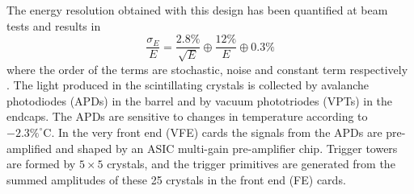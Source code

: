 The energy resolution obtained with this design has been quantified at beam tests and results in 
\begin{equation}
\frac{\sigma_{E}}{E}=\frac{2.8\%}{\sqrt{E}}\oplus\frac{12\%}{E}\oplus0.3\%
\end{equation}
where the order of the terms are stochastic, noise and constant term respectively \cite{Chatrchyan:2013dga}. 
The light produced in the scintillating crystals is collected by avalanche photodiodes (APDs) in the barrel and by vacuum phototriodes (VPTs) in the endcaps. 
The APDs are sensitive to changes in temperature according to $-2.3\%^{\circ}\mathrm{C}$. 
In the very front end (VFE) cards the signals from the APDs are pre-amplified and shaped by an ASIC multi-gain pre-amplifier chip. 
Trigger towers are formed by $5\times5$ crystals, and the trigger primitives are generated from the summed amplitudes of these 25 crystals in the front end (FE) cards. 
